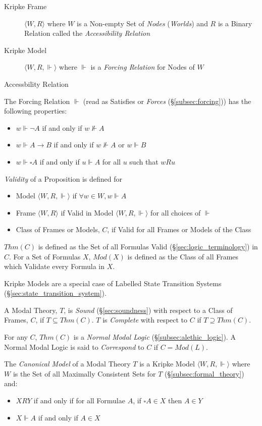 \documentclass{article}
\begin{document}
\begin{description}
\item [Kripke Frame] $\langle W,R \rangle$ where $W$ is a Non-empty
  Set of \emph{Nodes} (\emph{Worlds}) and $R$ is a Binary Relation
  called the \emph{Accessibility Relation}
\item [Kripke Model] $\langle W,R,\Vdash \rangle$ where $\Vdash$ is a
  \emph{Forcing Relation} for Nodes of $W$
\end{description}
Accessbility Relation %

The Forcing Relation $\Vdash$ (read as Satisfies or \emph{Forces}
(\S\ref{subsec:forcing})) has the following properties:
\begin{itemize}
\item $w \Vdash \neg A$ if and only if $w \nVdash A$
\item $w \Vdash A \rightarrow B$ if and only if $w \nVdash A$ or $w
  \Vdash B$
\item $w \Vdash \square A$ if and only if $u \Vdash A$ for all $u$
  such that $w R u$
\end{itemize}
\emph{Validity} of a Proposition is defined for
\begin{itemize}
\item Model $\langle W,R, \Vdash \rangle$ if $\forall w \in W,
  w \Vdash A$
\item Frame $\langle W,R \rangle$ if Valid in Model $\langle W,R,
  \Vdash \rangle$ for all choices of $\Vdash$
\item Class of Frames or Models, $C$, if Valid for all Frames or
  Models of the Class
\end{itemize}
$Thm(C)$ is defined as the Set of all Formulas Valid
(\S\ref{sec:logic_terminology}) in $C$. For a Set of Formulas $X$,
$Mod(X)$ is defined as the Class of all Frames which Validate every
Formula in $X$.

Kripke Models are a special case of Labelled State Transition Systems
(\S\ref{sec:state_transition_system}).

A Modal Theory, $T$, is \emph{Sound} (\S\ref{sec:soundness}) with
respect to a Class of Frames, $C$, if $T \subseteq Thm(C)$. $T$ is
\emph{Complete} with respect to $C$ if $T \supseteq Thm(C)$.

For any $C$, $Thm(C)$ is a \emph{Normal Modal Logic}
(\S\ref{subsec:alethic_logic}). A Normal Modal Logic is said to
\emph{Correspond} to $C$ if $C = Mod(L)$.

The \emph{Canonical Model} of a Modal Theory $T$ is a Kripke Model
$\langle W,R, \Vdash \rangle$ where $W$ is the Set of all Maximally
Consistent Sets for $T$ (\S\ref{subsec:formal_theory}) and:
\begin{itemize}
\item $XRY$ if and only if for all Formulae $A$, if $\square A
  \in X$ then $A \in Y$
\item $X\Vdash A$ if and only if $A \in X$
\end{itemize}
\end{document}
